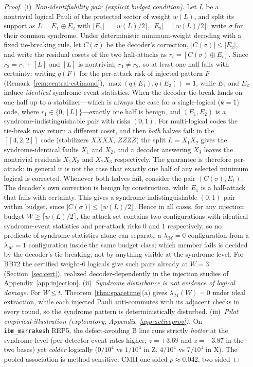 \documentclass[pdflatex,sn-mathphys-num]{sn-jnl}
\theoremstyle{thmstyleone}
\theoremstyle{thmstyletwo}
\theoremstyle{thmstylethree}
\begin{document}
\begin{proof}
(i)~\emph{Non-identifiability pair (explicit budget condition).} Let $L$ be a nontrivial logical Pauli of the protected sector of weight $w(L)$, and split its support as $L=E_1\oplus E_2$ with $|E_1|=\lceil w(L)/2\rceil$, $|E_2|=\lfloor w(L)/2\rfloor$; write $\sigma$ for their common syndrome. Under deterministic minimum-weight decoding with a fixed tie-breaking rule, let $C(\sigma)$ be the decoder's correction, $|C(\sigma)|\le|E_2|$, and write the residual cosets of the two half-attacks as $r_i=[C(\sigma)\oplus E_i]$. Since $r_2=r_1+[L]$ and $[L]$ is nontrivial, $r_1\ne r_2$, so at least one half fails with certainty: writing $q(F)$ for the per-attack risk of injected pattern $F$ (Remark~\ref{rem:central-estimand}), $\max(q(E_1),q(E_2))=1$, while $E_1$ and $E_2$ induce \emph{identical} syndrome-event statistics. When the decoder tie-break lands on one half up to a stabilizer—which is always the case for a single-logical ($k=1$) code, where $r_1\in\{0,[L]\}$—exactly one half is benign, and $(E_1,E_2)$ is a syndrome-indistinguishable pair with risks $(0,1)$. For multi-logical codes the tie-break may return a different coset, and then \emph{both} halves fail: in the $[[4,2,2]]$ code (stabilizers $XXXX$, $ZZZZ$) the split $L=X_1X_2$ gives the syndrome-identical faults $X_1$ and $X_2$, and a decoder answering $X_3$ leaves the nontrivial residuals $X_1X_3$ and $X_2X_3$ respectively. The guarantee is therefore per-attack: in general it is not the case that exactly one half of any selected minimum logical is corrected. Whenever both halves fail, consider the pair $(C(\sigma),E_1)$. The decoder's own correction is benign by construction, while $E_1$ is a half-attack that fails with certainty. This gives a syndrome-indistinguishable $(0,1)$ pair within budget, since $|C(\sigma)|\le\lfloor w(L)/2\rfloor$. Hence in all cases, for any injection budget $W\ge\lceil w(L)/2\rceil$, the attack set contains two configurations with identical syndrome-event statistics and per-attack risks $0$ and $1$ respectively, so no predicate of syndrome statistics alone can separate a $\lambda_{\mathcal M}=0$ configuration from a $\lambda_{\mathcal M}=1$ configuration inside the same budget class; which member fails is decided by the decoder's tie-breaking, not by anything visible at the syndrome level. For BB72 the certified weight-6 logicals give such pairs already at $W=3$ (Section~\ref{sec:cert}), realized decoder-dependently in the injection studies of Appendix~\ref{app:injection}. (ii)~\emph{Syndrome disturbance is not evidence of logical damage.} For $W\le t$, Theorem~\ref{thm:spacetime}(a) gives $\lambda_{\mathcal{M}}(W)=0$ under ideal extraction, while each injected Pauli anti-commutes with its adjacent checks in every round, so the syndrome pattern is deterministically disturbed. (iii)~\emph{Pilot empirical illustration (exploratory; Appendix~\ref{app:activeprov}).} On \texttt{ibm\_marrakesh} REP5, the defect-avoiding B line runs strictly \emph{hotter} at the syndrome level (per-detector event rates higher, $z=+3.69$ and $z=+3.87$ in the two bases) yet \emph{colder} logically ($0/10^4$ vs $1/10^4$ in Z, $4/10^4$ vs $7/10^4$ in X). The pooled association is method-sensitive: CMH one-sided $p\approx0.042$, two-sided 
\end{proof}
\end{document}
